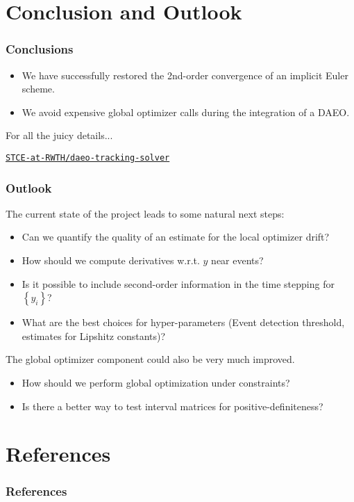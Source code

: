 \documentclass[10pt]{beamer}
\begin{document}
\section{Conclusion and Outlook}
\begin{frame}
	\frametitle{Conclusions}
	\vfill
	\begin{itemize}
		\item We have successfully restored the 2nd-order convergence of an implicit Euler scheme.
		\item We avoid expensive global optimizer calls during the integration of a DAEO.
	\end{itemize}
	\vfill
	For all the juicy details...
	\begin{center}
		\tt\href{https://github.com/STCE-at-RWTH/daeo-tracking-solver}{STCE-at-RWTH/daeo-tracking-solver}
	\end{center}
\end{frame}

\begin{frame}
	\frametitle{Outlook}
	The current state of the project leads to some natural next steps:
	\begin{itemize}
		\item Can we quantify the quality of an estimate for the local optimizer drift?
		\item How should we compute derivatives w.r.t. $y$ near events?
		\item Is it possible to include second-order information in the time stepping for $\left\{y_i\right\}$?
		\item What are the best choices for hyper-parameters (Event detection threshold, estimates for Lipshitz constants)?
	\end{itemize}
	\vfill
	The global optimizer component could also be very much improved.
	\begin{itemize}
		\item How should we perform global optimization under constraints?
		\item Is there a better way to test interval matrices for positive-definiteness?
	\end{itemize}
\end{frame}

\section{References}
\begin{frame}
	\frametitle{References}
	\printbibliography
\end{frame}
\end{document}
